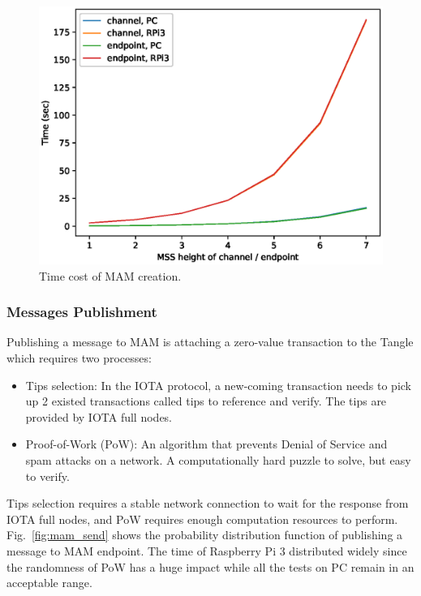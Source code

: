 \begin{spacing}{2.0}
\begin{figure}[h]
    \centering
    \includegraphics[width=5.in]{img/mam_create}
    \caption{Time cost of MAM creation.}
    \label{fig:mam_create}
\end{figure}

\subsubsection{Messages Publishment}
Publishing a message to MAM is attaching a zero-value transaction to the Tangle which requires two processes:
\begin{itemize}
    \item    Tips selection: In the IOTA protocol, a new-coming transaction needs to pick up 2 existed transactions called tips to reference and verify. The tips are provided by IOTA full nodes.
    \item    Proof-of-Work (PoW): An algorithm that prevents Denial of Service and spam attacks on a network. A computationally hard puzzle to solve, but easy to verify.
\end{itemize}

Tips selection requires a stable network connection to wait for the response from IOTA full nodes, and PoW requires enough computation resources to perform. Fig.~\ref{fig:mam_send} shows the probability distribution function of publishing a message to MAM endpoint. The time of Raspberry Pi 3 distributed widely since the randomness of PoW has a huge impact while all the tests on PC remain in an acceptable range.


\end{spacing}
